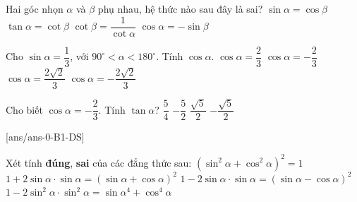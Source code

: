 \begin{ex}%
	Hai góc nhọn $\alpha$ và $\beta$ phụ nhau, hệ thức nào sau đây là sai?
	\choice
	{$\sin \alpha=\cos \beta$}
	{$\tan \alpha=\cot \beta$}
	{$\cot \beta=\dfrac{1}{\cot \alpha}$}
	{\True $\cos \alpha=-\sin \beta$}
	\loigiai{
		\[\cos \alpha=\cos \left(90^{^{\circ}}-\beta \right)=\sin \beta.
		\]
	}
\end{ex}


\begin{ex}%
	Cho $\sin \alpha=\dfrac{1}{3}$, với $90^{\circ} < \alpha < 180^{\circ}$. Tính $\cos \alpha$.
	\choice
	{$\cos \alpha=\dfrac{2}{3}$}
	{$\cos \alpha=-\dfrac{2}{3}$}
	{$\cos \alpha=\dfrac{2\sqrt{2}}{3}$}
	{\True $\cos \alpha=-\dfrac{2\sqrt{2}}{3}$}
\end{ex}


\begin{ex}%
	Cho biết $\cos \alpha=-\dfrac{2}{3}$. Tính $\tan \alpha$?
	\choice
	{$\dfrac{5}{4}$}
	{$-\dfrac{5}{2}$}
	{$\dfrac{\sqrt{5}}{2}$}
	{\True $-\dfrac{\sqrt{5}}{2}$}
\end{ex}


\cauds %
[ans/ans-0-B1-DS]

\begin{ex}%
	Xét tính \textbf{đúng}, \textbf{sai} của các đẳng thức sau:
	\choiceTF
	{\True $\left(\sin^2 \alpha+\cos^2 \alpha \right)^2=1$}
	{\True $1+2\sin \alpha \cdot \sin \alpha=(\sin \alpha+\cos \alpha)^2$}
	{\True $1-2\sin \alpha \cdot \sin \alpha=(\sin \alpha-\cos \alpha)^2$}
	{\True $1-2\sin^2 \alpha \cdot \sin^2 \alpha=\sin \alpha^4+\cos^4 \alpha$}
\end{ex}


